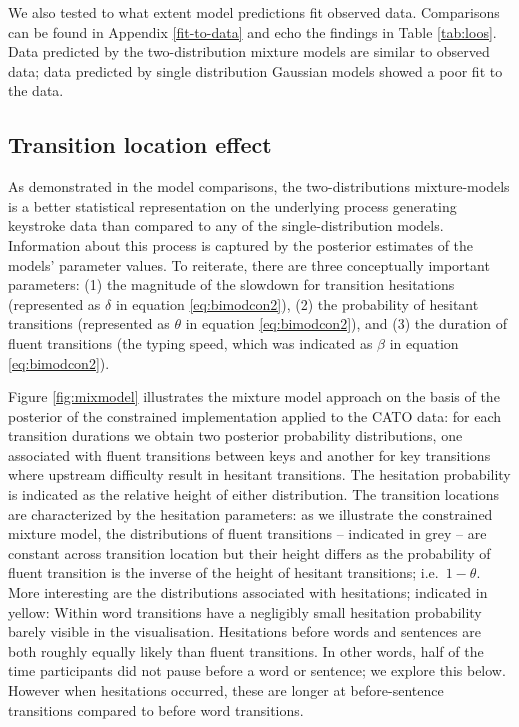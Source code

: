 \documentclass[
  man,floatsintext]{apa7}
\begin{document}
We also tested to what extent model predictions fit observed data. Comparisons can be found in Appendix \ref{fit-to-data} and echo the findings in Table \ref{tab:loos}. Data predicted by the two-distribution mixture models are similar to observed data; data predicted by single distribution Gaussian models showed a poor fit to the data.

\hypertarget{transition-location-effect}{%
\subsection{Transition location effect}\label{transition-location-effect}}

As demonstrated in the model comparisons, the two-distributions mixture-models is a better statistical representation on the underlying process generating keystroke data than compared to any of the single-distribution models. Information about this process is captured by the posterior estimates of the models' parameter values. To reiterate, there are three conceptually important parameters: (1) the magnitude of the slowdown for transition hesitations (represented as \(\delta\) in equation \ref{eq:bimodcon2}), (2) the probability of hesitant transitions (represented as \(\theta\) in equation \ref{eq:bimodcon2}), and (3) the duration of fluent transitions (the typing speed, which was indicated as \(\beta\) in equation \ref{eq:bimodcon2}).

Figure \ref{fig:mixmodel} illustrates the mixture model approach on the basis of the posterior of the constrained implementation applied to the CATO data: for each transition durations we obtain two posterior probability distributions, one associated with fluent transitions between keys and another for key transitions where upstream difficulty result in hesitant transitions. The hesitation probability is indicated as the relative height of either distribution. The transition locations are characterized by the hesitation parameters: as we illustrate the constrained mixture model, the distributions of fluent transitions -- indicated in grey -- are constant across transition location but their height differs as the probability of fluent transition is the inverse of the height of hesitant transitions; i.e.~\(1 - \theta\). More interesting are the distributions associated with hesitations; indicated in yellow: Within word transitions have a negligibly small hesitation probability barely visible in the visualisation. Hesitations before words and sentences are both roughly equally likely than fluent transitions. In other words, half of the time participants did not pause before a word or sentence; we explore this below. However when hesitations occurred, these are longer at before-sentence transitions compared to before word transitions.
\end{document}
